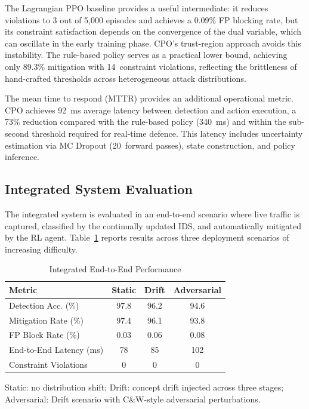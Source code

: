 \documentclass[journal]{IEEEtran}
\theoremstyle{definition}
\theoremstyle{remark}
\begin{document}
The Lagrangian PPO baseline provides a useful intermediate: it reduces violations to 3 out of 5{,}000 episodes and achieves a 0.09\% FP blocking rate, but its constraint satisfaction depends on the convergence of the dual variable, which can oscillate in the early training phase. CPO's trust-region approach avoids this instability. The rule-based policy serves as a practical lower bound, achieving only 89.3\% mitigation with 14~constraint violations, reflecting the brittleness of hand-crafted thresholds across heterogeneous attack distributions.

The mean time to respond (MTTR) provides an additional operational metric. CPO achieves 92~ms average latency between detection and action execution, a 73\% reduction compared with the rule-based policy (340~ms) and within the sub-second threshold required for real-time defence. This latency includes uncertainty estimation via MC Dropout (20~forward passes), state construction, and policy inference.

\subsection{Integrated System Evaluation}
\label{subsec:integrated_results}

The integrated system is evaluated in an end-to-end scenario where live traffic is captured, classified by the continually updated IDS, and automatically mitigated by the RL agent. Table~\ref{tab:integrated} reports results across three deployment scenarios of increasing difficulty.

\begin{table}[!t]
\centering
\caption{Integrated End-to-End Performance}
\label{tab:integrated}
\begin{threeparttable}
\begin{tabular}{@{}lccc@{}}
\toprule
\textbf{Metric} & \textbf{Static} & \textbf{Drift} & \textbf{Adversarial} \\
\midrule
Detection Acc. (\%) & 97.8 & 96.2 & 94.6 \\
Mitigation Rate (\%) & 97.4 & 96.1 & 93.8 \\
FP Block Rate (\%) & 0.03 & 0.06 & 0.08 \\
End-to-End Latency (ms) & 78 & 85 & 102 \\
Constraint Violations & 0 & 0 & 0 \\
\bottomrule
\end{tabular}
\begin{tablenotes}
\small
\item[] Static: no distribution shift; Drift: concept drift injected across three stages; Adversarial: Drift scenario with C\&W-style adversarial perturbations.
\end{tablenotes}
\end{threeparttable}
\end{table}
\end{document}
